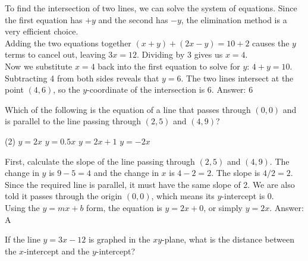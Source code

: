 \documentclass[11pt,paper=a4,answers]{exam}
\begin{document}
\begin{questions}
\begin{solution}
To find the intersection of two lines, we can solve the system of equations. Since the first equation has $+y$ and the second has $-y$, the elimination method is a very efficient choice.
\\[10pt]
Adding the two equations together $(x + y) + (2x - y) = 10 + 2$ causes the $y$ terms to cancel out, leaving $3x = 12$. Dividing by 3 gives us $x = 4$.
\\[10pt]
Now we substitute $x = 4$ back into the first equation to solve for $y$: $4 + y = 10$. Subtracting 4 from both sides reveals that $y = 6$. The two lines intersect at the point $(4, 6)$, so the $y$-coordinate of the intersection is 6.
\vspace{15pt}
Answer: \colorbox{yellow!100}{6}
\end{solution}

\question
Which of the following is the equation of a line that passes through $(0, 0)$ and is parallel to the line passing through $(2, 5)$ and $(4, 9)$?
\begin{tasks}(2)
    \task $y = 2x$
    \task $y = 0.5x$
    \task $y = 2x + 1$
    \task $y = -2x$
\end{tasks}

\begin{solution}
First, calculate the slope of the line passing through $(2, 5)$ and $(4, 9)$. The change in $y$ is $9 - 5 = 4$ and the change in $x$ is $4 - 2 = 2$. The slope is $4 / 2 = 2$.
\\[10pt]
Since the required line is parallel, it must have the same slope of 2. We are also told it passes through the origin $(0, 0)$, which means its $y$-intercept is 0. 
\\[10pt]
Using the $y = mx + b$ form, the equation is $y = 2x + 0$, or simply $y = 2x$.
\vspace{15pt}
Answer: \colorbox{yellow!100}{A}
\end{solution}

\question
If the line $y = 3x - 12$ is graphed in the $xy$-plane, what is the distance between the $x$-intercept and the $y$-intercept?


\end{questions}
\end{document}
